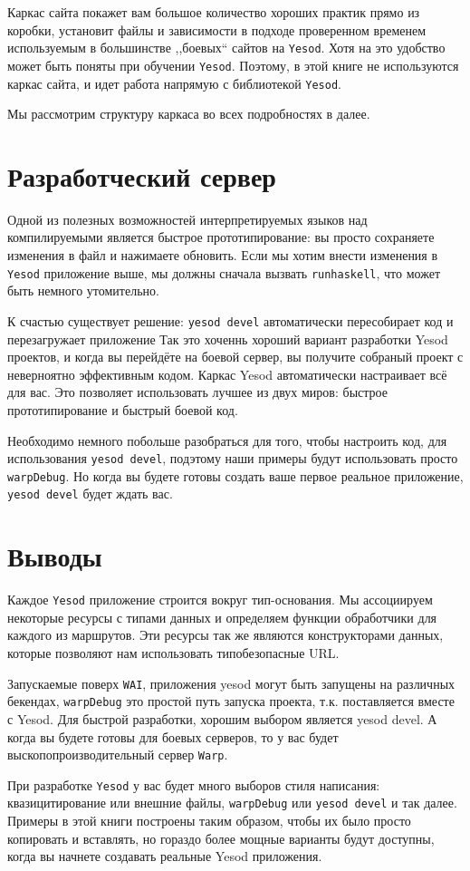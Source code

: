 Каркас сайта покажет вам большое количество хороших практик прямо 
из коробки, установит файлы и зависимости в подходе проверенном временем используемым в большинстве ,,боевых`` сайтов на \texttt{Yesod}.
Хотя на это удобство может быть поняты при обучении  \texttt{Yesod}.
Поэтому, в этой книге не используются каркас сайта, 
и идет работа напрямую с библиотекой \texttt{Yesod}.

Мы рассмотрим структуру каркаса во всех подробностях в далее.

\section{Разработческий сервер}

Одной из полезных возможностей интерпретируемых языков над компилируемыми является быстрое прототипирование: 
вы просто сохраняете изменения в файл и нажимаете обновить. 
Если мы хотим внести изменения в \texttt{Yesod} приложение выше, 
мы должны сначала вызвать \lstinline!runhaskell!, что может быть немного 
утомительно.

К счастью существует решение: \lstinline'yesod devel' автоматически 
пересобирает код и перезагружает приложение Так это хоченнь хороший вариант
разработки Yesod проектов, и когда вы перейдёте на боевой сервер,
вы получите собраный проект с неверноятно эффективным кодом. Каркас Yesod автоматически
настраивает всё для вас. Это позволяет использовать лучшее из двух миров: 
быстрое прототипирование и быстрый боевой код.

Необходимо немного побольше разобраться для того, чтобы настроить код, 
для использования \lstinline!yesod devel!, подэтому наши примеры будут 
использовать просто \lstinline!warpDebug!. Но когда вы будете готовы
создать ваше первое реальное приложение, \lstinline'yesod devel' будет ждать вас.

\section{Выводы}

Каждое \texttt{Yesod} приложение строится вокруг тип-основания. 
Мы ассоциируем некоторые ресурсы с типами данных и определяем функции обработчики 
для каждого из маршрутов. Эти ресурсы так же являются конструкторами данных, 
которые позволяют нам использовать типобезопасные URL.

Запускаемые поверх \texttt{WAI}, приложения yesod могут быть запущены на различных 
бекендах, \lstinline!warpDebug! это простой путь запуска проекта, т.к.
поставляется вместе с Yesod. Для быстрой разработки, хорошим выбором является yesod devel. 
А когда вы будете готовы для боевых серверов, то у вас будет выскопопроизводительный
сервер \texttt{Warp}.

При разработке \texttt{Yesod} у вас будет много выборов стиля написания: 
квазицитирование или внешние файлы,
\lstinline{warpDebug} или \lstinline'yesod devel' и так далее. Примеры в этой книги построены 
таким образом, чтобы их было просто копировать и вставлять, но гораздо более мощные варианты 
будут доступны, когда вы начнете создавать реальные Yesod приложения.

